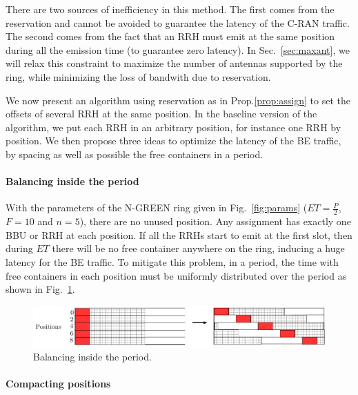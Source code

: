 \documentclass[10pt, conference, letterpaper]{IEEEtran}
\begin{document}
There are two sources of inefficiency in this method. The first comes from the reservation and cannot be avoided to guarantee the latency of the C-RAN traffic. The second comes from the fact that an RRH must emit at the same position during all the emission time (to guarantee zero latency). In Sec.~\ref{sec:maxant}, we will relax this constraint to maximize the number of antennas supported by the ring, while minimizing the loss of bandwith due to reservation.

We now present an algorithm using reservation as in Prop.\ref{prop:assign} to set the offsets of several RRH at the same position. In the baseline version of the algorithm, we put each RRH in an arbitrary position, for instance one RRH by position. We then propose three ideas to optimize the latency of the BE traffic, by spacing as well as possible the free containers in a period.

\paragraph{Balancing inside the period}

With the parameters of the N-GREEN ring given in Fig.~\ref{fig:params} ($ET = \frac{P}{2}$, $F = 10$ and $n = 5$), there are no unused position. Any assignment has exactly one  BBU or RRH at each position. If all the RRHs start to emit at the first slot, then during $ET$ there will be no free container anywhere on the ring, inducing a huge latency for the BE traffic. 
To mitigate this problem, in a period, the time with free containers in each position must be uniformly distributed over the period as shown in Fig.~\ref{fig:periodbal}.
\begin{figure}[h!]
\begin{center}   

      \includegraphics[scale=0.55]{repart2}
     \caption{Balancing inside the period.}\label{fig:periodbal}
     
\end{center}
  \end{figure}  
  

  
\paragraph{Compacting positions}
\end{document}
